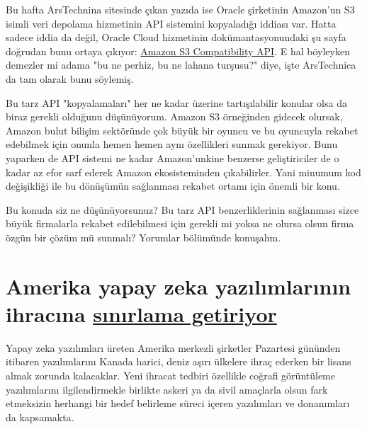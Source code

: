 \documentclass[11pt]{article}
\begin{document}
Bu hafta ArsTechnina sitesinde çıkan yazıda ise Oracle şirketinin Amazon'un S3
isimli veri depolama hizmetinin API sistemini kopyaladığı iddiası var. Hatta
sadece iddia da değil, Oracle Cloud hizmetinin dokümantasyonundaki şu sayfa
doğrudan bunu ortaya çıkıyor: \href{https://docs.cloud.oracle.com/iaas/Content/Object/Tasks/s3compatibleapi.htm}{Amazon S3 Compatibility API}. E hal böyleyken
demezler mi adama "bu ne perhiz, bu ne lahana turşusu?" diye, işte ArsTechnica
da tam olarak bunu söylemiş.

Bu tarz API "kopyalamaları" her ne kadar üzerine tartışılabilir konular olsa da
biraz gerekli olduğunu düşünüyorum. Amazon S3 örneğinden gidecek olursak,
Amazon bulut bilişim sektöründe çok büyük bir oyuncu ve bu oyuncuyla rekabet
edebilmek için onunla hemen hemen aynı özellikleri sunmak gerekiyor. Bunu
yaparken de API sistemi ne kadar Amazon'unkine benzerse geliştiriciler de o
kadar az efor sarf ederek Amazon ekosisteminden çıkabilirler. Yani minumum kod
değişikliği ile bu dönüşümün sağlanması rekabet ortamı için önemli bir konu.

Bu konuda siz ne düşünüyorsunuz? Bu tarz API benzerliklerinin sağlanması sizce
büyük firmalarla rekabet edilebilmesi için gerekli mi yoksa ne olursa olsun
firma özgün bir çözüm mü sunmalı? Yorumlar bölümünde konuşalım.
\section{Amerika yapay zeka yazılımlarının ihracına \href{https://www.reuters.com/article/us-usa-artificial-intelligence/u-s-government-limits-exports-of-artificial-intelligence-software-idUSKBN1Z21PT}{sınırlama getiriyor}}
\label{sec:org53861a3}
Yapay zeka yazılımları üreten Amerika merkezli şirketler Pazartesi gününden
itibaren yazılımlarını Kanada harici, deniz aşırı ülkelere ihraç ederken bir
lisans almak zorunda kalacaklar. Yeni ihracat tedbiri özellikle coğrafi
görüntüleme yazılımlarını ilgilendirmekle birlikte askeri ya da sivil amaçlarla
olsun fark etmeksizin herhangi bir hedef belirleme süreci içeren yazılımları ve
donanımları da kapsamakta.
\end{document}
